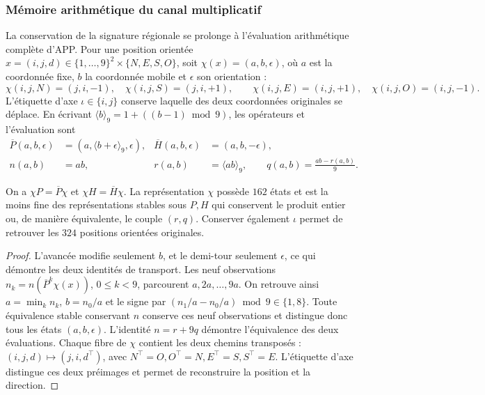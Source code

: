 \subsubsection{Mémoire arithmétique du canal multiplicatif}
\label{prd-arit:seccion}

La conservation de la signature régionale se prolonge à l'évaluation
arithmétique complète d'APP. Pour une position orientée
\(x=(i,j,d)\in\{1,\ldots,9\}^2\times\{N,E,S,O\}\), soit
\(\chi(x)=(a,b,\epsilon)\), où \(a\) est la coordonnée fixe,
\(b\) la coordonnée mobile et \(\epsilon\) son orientation :
\[
 \chi(i,j,N)=(j,i,-1),\quad \chi(i,j,S)=(j,i,+1),\qquad
 \chi(i,j,E)=(i,j,+1),\quad \chi(i,j,O)=(i,j,-1).
\]
L'étiquette d'axe \(\iota\in\{i,j\}\) conserve laquelle des
deux coordonnées originales se déplace. En écrivant
\(\langle b\rangle_9=1+((b-1)\bmod9)\), les opérateurs et
l'évaluation sont
\begin{align}
 \overline P(a,b,\epsilon)&=(a,\langle b+\epsilon\rangle_9,\epsilon),
 &\overline H(a,b,\epsilon)&=(a,b,-\epsilon),\label{prd-arit:PH}\\
 n(a,b)&=ab,&r(a,b)&=\langle ab\rangle_9,\qquad
 q(a,b)=\frac{ab-r(a,b)}9.\label{prd-arit:rq}
\end{align}

\begin{proposition}
\label{prd-arit:minimal}
On a \(\chi P=\overline P\chi\) et
\(\chi H=\overline H\chi\). La représentation \(\chi\)
possède \(162\) états et est la moins fine des représentations
stables sous \(P,H\) qui conservent le produit entier ou,
de manière équivalente, le couple \((r,q)\). Conserver également \(\iota\)
permet de retrouver les \(324\) positions orientées originales.
\end{proposition}
\begin{proof}
L'avancée modifie seulement \(b\), et le demi-tour seulement
\(\epsilon\), ce qui démontre les deux identités de transport.
Les neuf observations \(n_k=n(\overline P^k\chi(x))\),
\(0\leq k<9\), parcourent \(a,2a,\ldots,9a\). On retrouve ainsi
\(a=\min_k n_k\), \(b=n_0/a\) et le signe par
\((n_1/a-n_0/a)\bmod9\in\{1,8\}\). Toute équivalence stable
conservant \(n\) conserve ces neuf observations et distingue donc
tous les états \((a,b,\epsilon)\).
L'identité \(n=r+9q\) démontre l'équivalence des deux
évaluations. Chaque fibre de \(\chi\) contient les deux chemins
transposés : \((i,j,d)\mapsto(j,i,d^\top)\), avec
\(N^\top=O,O^\top=N,E^\top=S,S^\top=E\). L'étiquette d'axe distingue
ces deux préimages et permet de reconstruire la position et la direction.
\end{proof}

